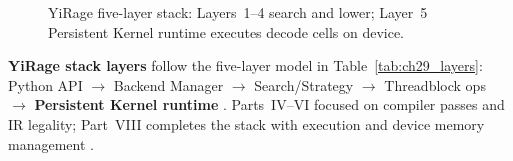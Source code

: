 
\begin{figure}[t]
\centering
{}
\caption{YiRage five-layer stack: Layers~1--4 search and lower; Layer~5 Persistent Kernel runtime executes decode cells on device.}
\label{fig:yirage_stack_layers_pipeline}
\end{figure}

\textbf{YiRage stack layers} follow the five-layer model in Table~\ref{tab:ch29_layers}: Python API $\rightarrow$ Backend Manager $\rightarrow$ Search/Strategy $\rightarrow$ Threadblock ops $\rightarrow$ \textbf{Persistent Kernel runtime} \citep{yirage2026,chen2020compilerbasedhardw,patel2025llminference,dlbook}. Parts~IV--VI focused on compiler passes and IR legality; Part~VIII completes the stack with execution and device memory management \citep{yirage2026,taxbreak2026,memoryfloor2026,kwon2023vllm,liu2024deepseekv3,amd2024xdna,amd2024aie,semianalysis2024tma,dao2022flashattention,dao2023flashdecoding,nvidia2022hopper,nvidia2024cudagraphs,chen2020compilerbasedhardw}.

